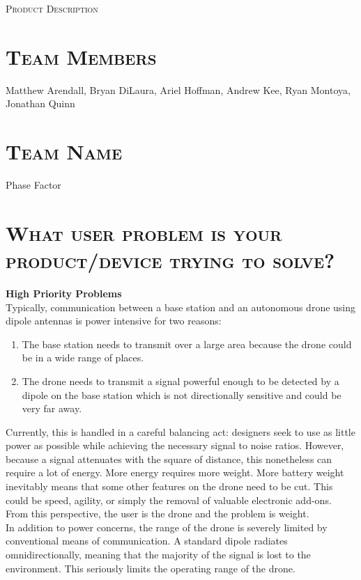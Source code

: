 \documentclass[11pt]{article}
\numberwithin{figure}{section}
\begin{document}
\begin{center}
	\textsc{\Large Product Description}\\
	\hrulefill 
\end{center}

\section{\textsc{Team Members}}
	Matthew Arendall, Bryan DiLaura, Ariel Hoffman, Andrew Kee, Ryan Montoya, Jonathan Quinn
	
\section{\textsc{Team Name}}
	Phase Factor
	
\section{\textsc{What user problem is your product/device trying to solve?}}
	\textbf{High Priority Problems}  \\
	Typically, communication between a base station and an autonomous drone using dipole antennas is power intensive for two reasons: 
	\begin{enumerate}
		\item The base station needs to transmit over a large area because the drone could be in a wide range of places.
		\item The drone needs to transmit a signal powerful enough to be detected by a dipole on the base station which is not directionally sensitive and could be very far away.
	\end{enumerate}
	Currently, this is handled in a careful balancing act: designers seek to use as little power as possible while achieving the necessary signal to noise ratios. However, because a signal attenuates with the square of distance, this nonetheless can require a lot of energy.  More energy requires more weight. More battery weight inevitably means that some other features on the drone need to be cut. This could be speed, agility, or simply the removal of valuable electronic add-ons. From this perspective, the user is the drone and the problem is weight. \\
	
	In addition to power concerns, the range of the drone is severely limited by conventional means of communication.  A standard dipole radiates omnidirectionally, meaning that the majority of the signal is lost to the environment.  This seriously limits the operating range of the drone.  \\
	
\end{document}
